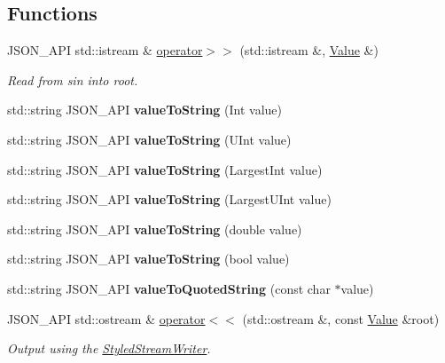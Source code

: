 \subsection*{Functions}
\begin{DoxyCompactItemize}
\item 
J\+S\+O\+N\+\_\+\+A\+PI std\+::istream \& \mbox{\hyperlink{namespace_json_a1b4aef303177bbd4d18acc87858e0ec2}{operator$>$$>$}} (std\+::istream \&, \mbox{\hyperlink{class_json_1_1_value}{Value}} \&)
\begin{DoxyCompactList}\small\item\em Read from \textquotesingle{}sin\textquotesingle{} into \textquotesingle{}root\textquotesingle{}. \end{DoxyCompactList}\item 
\mbox{\label{namespace_json_a05cd078d8e086a4bcc08d40948f711e7}} 
std\+::string J\+S\+O\+N\+\_\+\+A\+PI {\bfseries value\+To\+String} (Int value)
\item 
\mbox{\label{namespace_json_abcb58ea0f384c30608729a94d539e2ce}} 
std\+::string J\+S\+O\+N\+\_\+\+A\+PI {\bfseries value\+To\+String} (U\+Int value)
\item 
\mbox{\label{namespace_json_aa1196d8fd3181d75e8e08dd298c9740f}} 
std\+::string J\+S\+O\+N\+\_\+\+A\+PI {\bfseries value\+To\+String} (Largest\+Int value)
\item 
\mbox{\label{namespace_json_a0865b0680454002643dd9f3d22a2c80d}} 
std\+::string J\+S\+O\+N\+\_\+\+A\+PI {\bfseries value\+To\+String} (Largest\+U\+Int value)
\item 
\mbox{\label{namespace_json_ac49317cb2f19e656c9cb548dd31e50d5}} 
std\+::string J\+S\+O\+N\+\_\+\+A\+PI {\bfseries value\+To\+String} (double value)
\item 
\mbox{\label{namespace_json_a959f412bb2e8a5cf50f2cc36cd7b3376}} 
std\+::string J\+S\+O\+N\+\_\+\+A\+PI {\bfseries value\+To\+String} (bool value)
\item 
\mbox{\label{namespace_json_aa89082c7ae7deaa6df955987015a0cbd}} 
std\+::string J\+S\+O\+N\+\_\+\+A\+PI {\bfseries value\+To\+Quoted\+String} (const char $\ast$value)
\item 
J\+S\+O\+N\+\_\+\+A\+PI std\+::ostream \& \mbox{\hyperlink{namespace_json_a0ef6e98bafd4dba52f6ef28ed33913f4}{operator$<$$<$}} (std\+::ostream \&, const \mbox{\hyperlink{class_json_1_1_value}{Value}} \&root)
\begin{DoxyCompactList}\small\item\em Output using the \mbox{\hyperlink{class_json_1_1_styled_stream_writer}{Styled\+Stream\+Writer}}. \end{DoxyCompactList}\end{DoxyCompactItemize}


